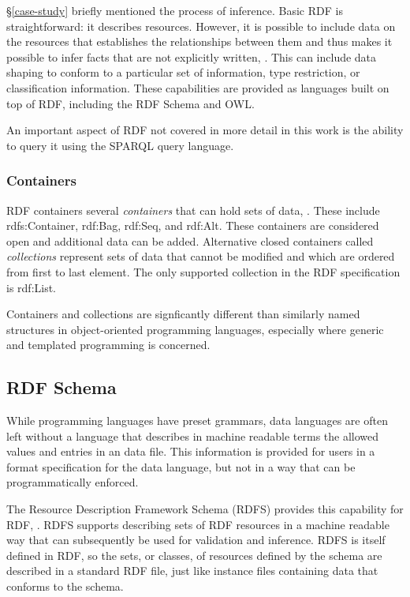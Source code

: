 \S \ref{case-study} briefly mentioned the process of inference. Basic RDF is
straightforward: it describes resources. However, it is possible to include data
on the resources that establishes the relationships between them and thus makes
it possible to infer facts that are not explicitly written,
\cite{allemang_semantic_2008}. This can include data shaping to conform to a
particular set of information, type restriction, or classification information.
These capabilities are provided as languages built on top of RDF, including the
RDF Schema and OWL.

An important aspect of RDF not covered in more detail in this work is the
ability to query it using the SPARQL query language. 


\subsubsection{Containers}

RDF containers several \textit{containers} that can hold sets of data,
\cite{rdf-syntax}. These include rdfs:Container, rdf:Bag, rdf:Seq, and rdf:Alt.
These containers are considered open and additional data can be added.
Alternative closed containers called \textit{collections} represent sets of data
that cannot be modified and which are ordered from first to last element. The
only supported collection in the RDF specification is rdf:List.

Containers and collections are signficantly different than similarly named
structures in object-oriented programming languages, especially where generic
and templated programming is concerned.

\subsection{RDF Schema}

While programming languages have preset grammars, data languages are often
left without a language that describes in machine readable terms the allowed
values and entries in an data file. This information is provided for users in
a format specification for the data language, but not in a way that can be
programmatically enforced. 

The Resource Description Framework Schema (RDFS) provides this capability for
RDF, \cite{rdf-schema, allemang_semantic_2008}. RDFS supports describing sets
of RDF resources in a machine readable way that can subsequently be used for
validation and inference. RDFS is itself defined in RDF, so the sets, or
classes, of resources defined by the schema are described in a standard RDF
file, just like instance files containing data that conforms to the schema.


